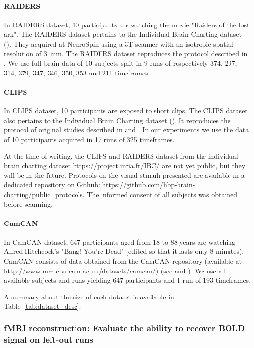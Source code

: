 \paragraph{RAIDERS}
In RAIDERS dataset, 10 participants are watching the movie "Raiders of the lost ark".
% 
The RAIDERS dataset pertains to the Individual Brain Charting dataset (\cite{ibc}).
% 
They acquired at NeuroSpin using a 3T scanner with an isotropic spatial resolution of 3 mm.
% 
The RAIDERS dataset reproduces the protocol described in \cite{haxby2011common}.
%
We use full brain data of 10 subjects split in 9 runs of respectively 374, 297, 314, 379, 347, 346, 350, 353 and 211 timeframes.

\paragraph{CLIPS}
In CLIPS dataset, 10 participants are exposed to short clips. 
%
The CLIPS dataset also pertains to the Individual Brain Charting dataset (\cite{ibc}).
%
It reproduces the protocol of original studies described in \cite{nishimoto2011reconstructing} and \cite{huth2012continuous}.
%
In our experiments we use the data of 10 participants acquired in 17 runs of 325 timeframes.

At the time of writing, the CLIPS and RAIDERS dataset from the individual brain charting dataset \url{https://project.inria.fr/IBC/} are not yet public, but they will be in the future. Protocols on the visual stimuli presented are available in a dedicated repository on Github: \url{https://github.com/hbp-brain-charting/public_protocols}. The informed consent of all subjects was obtained before scanning.

\paragraph{CamCAN}
In CamCAN dataset, 647 participants aged from 18 to 88 years are watching Alfred Hitchcock's "Bang! You're Dead" (edited so that it lasts only 8 minutes).
%
CamCAN consists of data obtained from the CamCAN repository (available at \url{http://www.mrc-cbu.cam.ac.uk/datasets/camcan/}) (see \cite{taylor2017cambridge} and \cite{shafto2014cambridge}).
%
We use all available subjects and runs yielding 647 participants and 1 run of 193 timeframes.

A summary about the size of each dataset is available in Table~\ref{tab:dataset_desc}.


\subsubsection{fMRI reconstruction: Evaluate the ability to recover BOLD signal on left-out runs}
\label{reconstruction}

